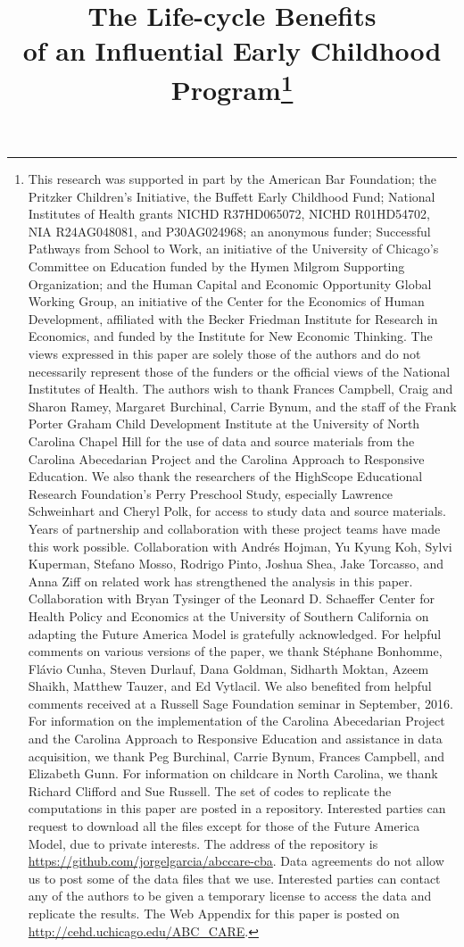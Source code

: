 \begin{titlepage}
\title{\Large \textbf{The Life-cycle Benefits \\ of an Influential Early Childhood Program}\thanks{This research was supported in part by the American Bar Foundation; the Pritzker Children's Initiative, the Buffett Early Childhood Fund; National Institutes of Health grants NICHD R37HD065072, NICHD R01HD54702, NIA R24AG048081, and P30AG024968; an anonymous funder; Successful Pathways from School to Work, an initiative of the University of Chicago's Committee on Education funded by the Hymen Milgrom Supporting Organization; and the Human Capital and Economic Opportunity Global Working Group, an initiative of the Center for the Economics of Human Development, affiliated with the Becker Friedman Institute for Research in Economics, and funded by the Institute for New Economic Thinking. The views expressed in this paper are solely those of the authors and do not necessarily represent those of the funders or the official views of the National Institutes of Health. The authors wish to thank Frances Campbell, Craig and Sharon Ramey, Margaret Burchinal, Carrie Bynum, and the staff of the Frank Porter Graham Child Development Institute at the University of North Carolina Chapel Hill for the use of data and source materials from the Carolina Abecedarian Project and the Carolina Approach to Responsive Education. We also thank the researchers of the HighScope Educational Research Foundation's Perry Preschool Study, especially Lawrence Schweinhart and Cheryl Polk, for access to study data and source materials. Years of partnership and collaboration with these project teams have made this work possible. Collaboration with Andr\'{e}s Hojman, Yu Kyung Koh, Sylvi Kuperman, Stefano Mosso, Rodrigo Pinto, Joshua Shea, Jake Torcasso, and Anna Ziff on related work has strengthened the analysis in this paper. Collaboration with Bryan Tysinger of the Leonard D. Schaeffer Center for Health Policy and Economics at the University of Southern California on adapting the Future America Model is gratefully acknowledged. For helpful comments on various versions of the paper, we thank St\'{e}phane Bonhomme, Fl\'{a}vio Cunha, Steven Durlauf, Dana Goldman, Sidharth Moktan, Azeem Shaikh, Matthew Tauzer, and Ed Vytlacil. We also benefited from helpful comments received at a Russell Sage Foundation seminar in September, 2016. For information on the implementation of the Carolina Abecedarian Project and the Carolina Approach to Responsive Education and assistance in data acquisition, we thank Peg Burchinal, Carrie Bynum, Frances Campbell, and Elizabeth Gunn. For information on childcare in North Carolina, we thank Richard Clifford and Sue Russell. The set of codes to replicate the computations in this paper are posted in a repository. Interested parties can request to download all the files except for those of the Future America Model, due to private interests. The address of the repository is \url{https://github.com/jorgelgarcia/abccare-cba}. Data agreements do not allow us to post some of the data files that we use. Interested parties can contact any of the authors to be given a temporary license to access the data and replicate the results. The Web Appendix for this paper is posted on \url{http://cehd.uchicago.edu/ABC_CARE}.}}


\end{titlepage}
